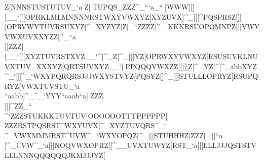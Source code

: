Z[NNNSTUSTUTUV_`a                                                            ^^^Z[\XYZYZ[XYZUVWUVX\]^]^^STUPQS\]_                                                            ZZZ^_```a_``^^_\]]WWW\]][\]\]][\]__`                                                            [[[OPRKLMLMNNNNRSTWXYVWXYZ[XYZUVX]^_                                                            [[[\]^PQSPRSZ[\YZ[UVWUVXNOQOPRRSU[\^                                                            XXXNOQUVWNOQPPPXYZ_``UVWQQQOOOSTUZ[\                                                            ]]][\]OPRVWYTUVRSUXYZ]^_XYZYZ[Z[\_``                                                            ZZZZ[\QRTZ[\VWYKKKOPRSTVQRSSTVSTU]^_                                                            ^^^KKKRSUOPQMNPZ[\RSTSTUWXYWXYYZ[^_`                                                            ]]]VWYVWXUVXXYZZ[^_``a\\]\]]ZZZ\]][\][\]\\]__`                                                            [[[XYZTUVRSTXYZ__`\]^]^_Z[\YZ[WXY]^_                                                            [[[YZ[OPRWXYVWXYZ[RSUSUVKLNUVXTUV\]_                                                            XXXYZ[QRTSUVXYZ__`]^^PPPQQQVWXZZ[[\]                                                            ]]]Z[\YZ[XYZWXY]^_YZ[\]^]^_abbXYZ^_`                                                            [[[^_`WXYPQRQRSJJJWXYSTVYZ[PQSYZ[]^_                                                            [[[STULLLOPRYZ[RSUPQRYZ[VWXTUVSTU_`a                                                            \\\WXZXYZWXZWXYVWXXYZXYZ``aabb]^_^_`                                                            YYY``aaab``a]^^\\]ZZZ^^_\\]]]^ZZ\_``                                                            \\\IJLTUW[\]``a_`a``aXYZXYZVWXQRT_`a                                                            [[[YZ[QRTQRTUVX[\]YZ[[\]VWYUVXNOQ]^`                                                            ZZZSTUKKKTUVTUV[\]OOOOOOTTTPPPPPP[\\                                                            ZZZRSTPQSRST\]^WXYUVX]^_XYZTUVQRS^_`                                                            \\\]^_VWXMMMRST\]^UVW^_`WXYOPQZ[\]^_                                                            ]]]STUHHHZ[\WXZSTU[\]ZZ[TUVQRS[\]_`a                                                            \\\YZ[Z[\]^_[\]XYZ[\]abbaab__`_``\]^                                                            ZZZaab``a__`[\]\\]ZZZ]^^]^^]^^\]]``a                                                            \\\JKMOPQXYZWXYUVXTUVWXY]^_UVW\]^_`a                                                            [[[NOQVWXOPRZ[\YZ[^__UVXTUWYZ[RST_`a                                                            [[[LLLJJJQSTSTVLLLNNNQQQQQQJKMJJJYZ[                                               